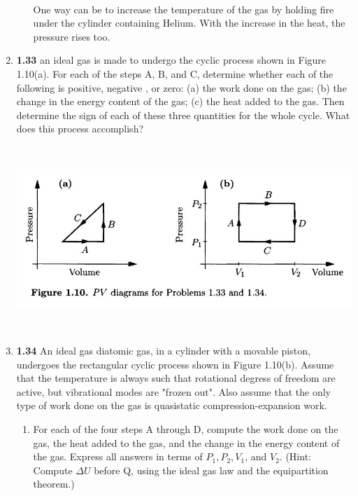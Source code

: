 \documentclass[fleqn]{article}
\begin{document}
\begin{enumerate}
\begin{enumerate}
        \textcolor{hwColor}{
          \\
          One way can be to increase the temperature of the gas by holding fire under the cylinder containing Helium. With 
          the increase in the heat, the pressure rises too.
        }

    \end{enumerate}

    \pagebreak

    \item \textbf{1.33} an ideal gas is made to undergo the cyclic process shown in Figure 1.10(a). For
    each of the steps A, B, and C, determine whether each of the following is positive, negative , or zero: 
    (a) the work done on the gas; (b) the change in the energy content of the gas; (c) the heat added to the gas. 
    Then determine the sign of each of these three quantities for the whole cycle. What does this process accomplish?

    \begin{center}
      \includegraphics[height=7cm, width=16cm]{1.JPG}
    \end{center}


    \item \textbf{1.34} An ideal gas diatomic gas, in a cylinder with a movable piston, undergoes the rectangular cyclic process
    shown in Figure 1.10(b). Assume that the temperature is always such that rotational degress of freedom are active, but vibrational
    modes are "frozen out". Also assume that the only type of work done on the gas is quasistatic compression-expansion work.
    \begin{enumerate}
      \item For each of the four steps A through D, compute the work done on the gas, the heat added to the gas, and the change in the energy
      content of the gas. Express all answers in terms of $P_1, P_2, V_1$, and $V_2$. (Hint: Compute $\Delta U$ before Q, using
      the ideal gas law and the equipartition theorem.)


\end{enumerate}
\end{enumerate}
\end{document}
